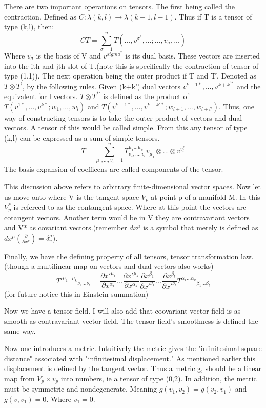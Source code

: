 There are two important operations on tensors. The first being called the contraction. Defined as $C: \lambda(k,l) \to \lambda (k-1, l-1)$. Thus if T is a tensor of type (k,l), then:
\[
CT= \sum_{\sigma=1}^n T(..., v^{\sigma^*},...;...,v_\sigma,...)
  \]
  Where $v_\sigma$ is the basis of V and $v^{sigma^*}$ is its dual basis. These vectors are inserted into the ith and jth slot of T.(note this is specifically the contraction of tensor of type (1,1)).
The next operation being the outer product if T and T'. Denoted as $T \otimes T^{'}$, by the following rules. Given (k+k') dual vectors $v^{k+1*},...,v^{k+k^{'*}}$ and the equivalent for l vectors. $T \otimes T^{*'}$ is defined as the product of $T(v^{1*},...,v^{k*};w_1,...,w_l)$ and $T(v^{k+1*},...,v^{k+k'*};w_{l+1},...,w_{l+l'})$. Thus, one way of constructing tensors is to take the outer product of vectors and dual vectors. A tensor of this would be called simple. From this any tensor of type (k,l) can be expressed as a sum of simple tensors.
\[
    T= \sum_{\mu_1,...,v_l=1}^n T^{\mu_1...\mu_k}_{v_1,...,v_l}v_{\mu_1} \otimes ... \otimes v^{v_l^*}
  \]
  The basis expansion of coefficens are called components of the tensor.

  This discussion above refers to arbitrary finite-dimensional vector spaces. Now let us move onto where V is the tangent space $V_p$ at point p of a manifold M. In this $V_p^*$ is refereed to as the contangent space. Where at this point the vectors are cotangent vectors. Another term would be in V they are contravariant vectors and V* as covariant vectors.(remember $dx^\mu$ is a symbol that merely is defined as $dx^\mu(\frac{\partial}{\partial x^v})=\delta^\mu_v$).

Finally, we have the defining property of all tensors, tensor transformation law.(though a multilinear map on vectors and dual vectors also works)
\[
T'^{\mu_1 \dots \mu_k}{}_{\nu_1 \dots \nu_l}
=
\frac{\partial x'^{\mu_1}}{\partial x^{\alpha_1}}
\dots
\frac{\partial x'^{\mu_k}}{\partial x^{\alpha_k}}
\frac{\partial x^{\beta_1}}{\partial x'^{\nu_1}}
\dots
\frac{\partial x^{\beta_l}}{\partial x'^{\nu_l}}
T^{\alpha_1 \dots \alpha_k}{}_{\beta_1 \dots \beta_l}
  \]
(for future notice this in Einstein summation)

Now we have a tensor field. I will also add that coovariant vector field is as smooth as contravariant vector field. The tensor field's smoothness is defined the same way.

Now one introduces a metric. Intuitively the metric gives the "infinitesimal square distance" associated with "infinitesimal displacement." As mentioned earlier this displacement is defined by the tangent vector. Thus a metric g, should be a linear map from $V_p \times v_p$ into numbers, ie a tensor of type (0,2). In addition, the metric must be symmetric and nondegenerate. Meaning $g(v_1,v_2)= g(v_2,v_1)$ and $g(v,v_1)=0$. Where $v_1 = 0$.

